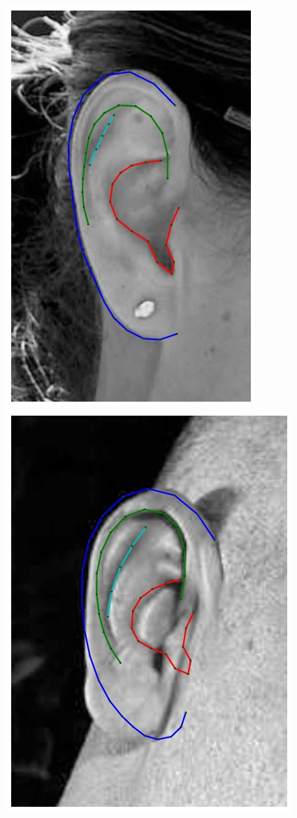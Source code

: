 \begin{figure}[!t]
    \includegraphics[height=\flowh]{resources/Ear_Deformable_Model/ear_10}
    \hfill
    \includegraphics[height=\flowh]{resources/Ear_Deformable_Model/ear_14}

\end{figure}
